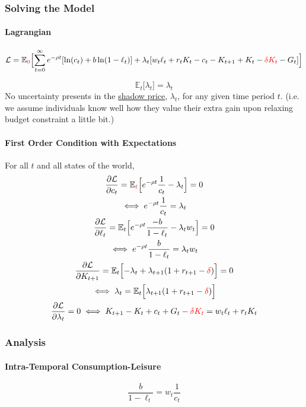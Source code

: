 \documentclass[11pt]{article}
\newcommand{\expat}[2]{\mathbb{E}_{#1}\Big[{#2}\Big]}
\begin{document}
		\subsubsection{Solving the Model}
			\paragraph{Lagrangian}
			\begin{equation}
				\mc{L} = \expat{\textcolor{red}{0}}{\sum_{t=0}^\infty e^{-\rho t}[\ln(c_t) + b \ln(1-\ell_t)] + \lambda_t [w_t \ell_t + r_t K_t - c_t - K_{t+1} + K_t - \textcolor{red}{\delta K_t} - G_t]}
			\end{equation}

			\begin{remark}
				\[
					\expat{t}{\lambda_t} = \lambda_t
				\]
				No uncertainty presents in the \ul{shadow price}, $\lambda_t$, for any given time period $t$. (i.e. we assume individuals know well how they value their extra gain upon relaxing budget constraint a little bit.)
			\end{remark}

			\paragraph{First Order Condition with Expectations}
			For all $t$ and all states of the world,
			\begin{gather}
				\pd{\mc{L}}{c_t} = \expat{\textcolor{red}{t}}{e^{-\rho t}\frac{1}{c_t} - \lambda_t} = 0 \\
				\iff e^{-\rho t} \frac{1}{c_t} = \lambda_t \\
				\pd{\mc{L}}{\ell_t} = \expat{t}{e^{-\rho t} \frac{-b}{1-\ell_t} - \lambda_t w_t} = 0 \\
				\iff e^{-\rho t} \frac{b}{1-\ell_t} = \lambda_t w_t \\
				\pd{\mc{L}}{K_{t+1}} = \expat{t}{-\lambda_t + \lambda_{t+1}(1 + r_{t+1} - \textcolor{red}{\delta})} = 0 \\
				\iff \lambda_t = \expat{t}{\lambda_{t+1}(1+r_{t+1} - \textcolor{red}{\delta})} \\
				\pd{\mc{L}}{\lambda_t} = 0 \iff K_{t+1} - K_t + c_t + G_t - \textcolor{red}{\delta K_t}= w_t \ell_t + r_t K_t
			\end{gather}
		\subsubsection{Analysis}
			\paragraph{Intra-Temporal Consumption-Leisure}
			\begin{equation}
				\frac{b}{1-\ell_t} = w_t\frac{1}{c_t}
			\end{equation}
			
\end{document}
